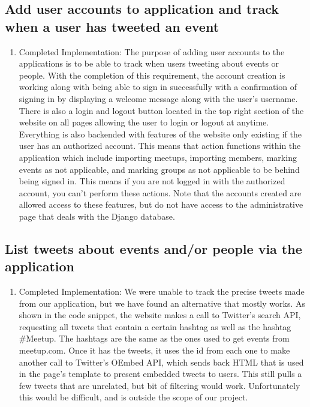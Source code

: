 \documentclass[draftclsnofoot,10pt,onecolumn]{IEEEtran} %
\begin{document}
\begin{enumerate}
\subsection{Add user accounts to application and track when a user has tweeted an event}
\begin{enumerate}
  \item Completed Implementation: The purpose of adding user accounts to the applications
    is to be able to track when users tweeting about events or people. With the completion
    of this requirement, the account creation is working along with being able to sign in 
    successfully with a confirmation of signing in by displaying a welcome message along with
    the user's username. There is also a login and logout button located in the
    top right section of the website on all pages allowing the user to login or
    logout at anytime. Everything is also backended with features of the website only existing
    if the user has an authorized account. This means that action functions within the application
    which include importing meetups, importing members, marking events as not
    applicable, and marking groups as not applicable to be behind being signed in.
    This means if you are not logged in with the authorized account, you can't perform these 
    actions. Note that the accounts created are allowed access to these features, but do not
    have access to the administrative page that deals with the Django database.

\end{enumerate}

\subsection{List tweets about events and/or people via the application}
\begin{enumerate}
  \item Completed Implementation: We were unable to track the precise tweets
    made from our application, but we have found an alternative that mostly
    works. As shown in the code snippet, the website makes a call to Twitter's
    search API, requesting all tweets that contain a certain hashtag as well as
    the hashtag \#Meetup. The hashtags are the same as the ones used to get
    events from meetup.com. Once it has the tweets, it uses the id from each one
    to make another call to Twitter's OEmbed API, which sends back HTML that is
    used in the page's template to present embedded tweets to users. This still
    pulls a few tweets that are unrelated, but bit of filtering would work.
    Unfortunately this would be difficult, and is outside the scope of our
    project.
\end{enumerate}



\end{enumerate}
\end{document}
